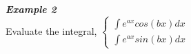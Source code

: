 \documentclass[12px]{article}
\begin{document}
\begin{enumerate}
\begin{multicols}{2}
        \\
        \\
        \textit{\textbf{Example 2}}\\
        Evaluate the integral, 
        $\left\{
        \begin{aligned}
            \int e^{ax}cos(bx)dx\\
            \int e^{ax}sin(bx)dx
        \end{aligned}\right.$
        \\
        \\
        \\
        \\
    \end{multicols}
\end{enumerate}
\end{document}
